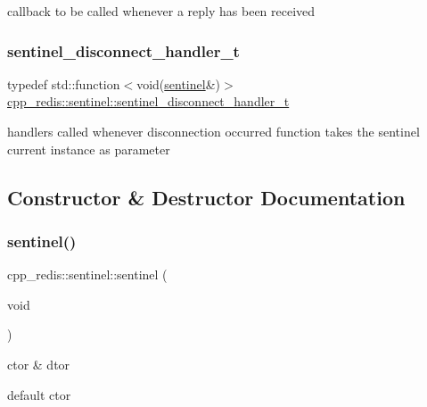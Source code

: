 callback to be called whenever a reply has been received \mbox{\label{classcpp__redis_1_1sentinel_a923e06b5b700c16dffec8a01d2fa9aa4}} 
\subsubsection{\texorpdfstring{sentinel\+\_\+disconnect\+\_\+handler\+\_\+t}{sentinel\_disconnect\_handler\_t}}
{\footnotesize\ttfamily typedef std\+::function$<$void(\mbox{\hyperlink{classcpp__redis_1_1sentinel}{sentinel}}\&)$>$ \mbox{\hyperlink{classcpp__redis_1_1sentinel_a923e06b5b700c16dffec8a01d2fa9aa4}{cpp\+\_\+redis\+::sentinel\+::sentinel\+\_\+disconnect\+\_\+handler\+\_\+t}}}

handlers called whenever disconnection occurred function takes the sentinel current instance as parameter 

\subsection{Constructor \& Destructor Documentation}
\mbox{\label{classcpp__redis_1_1sentinel_a2ea5a80a9139d5192706988521a2ae34}} 
\subsubsection{\texorpdfstring{sentinel()}{sentinel()}\hspace{0.1cm}{\footnotesize\ttfamily [1/2]}}
{\footnotesize\ttfamily cpp\+\_\+redis\+::sentinel\+::sentinel (\begin{DoxyParamCaption}\item[{void}]{ }\end{DoxyParamCaption})}



ctor \& dtor 

default ctor \mbox{\label{classcpp__redis_1_1sentinel_af53665f5834dfe5861a6310318ae5169}} 
